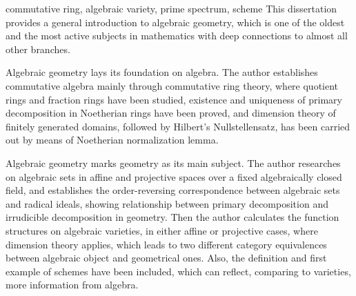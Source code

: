 

\begin{abstract}{交换幺环, 代数簇, 素谱, 概型}
  代数几何历史悠久而又充满活力, 与其它数学分支有着深刻的联系, 是一门重要的学科. 代数几何包含代数与几何, 可以看成代数理论应用到几何的研究之中.

  代数几何的理论根基在于代数. 本文从基本定义开始建立了以环论为主模论为辅的交换代数理论, 研究了商环与分式环的基本性质, 证明了Noether环上准素分解的存在性及其满足的唯一性, 以域论为基础利用Noether正规化引理证明了域的有限生成整环上的维数定理和Hilbert零点定理.

  代数几何的研究对象在于几何. 本文研究了固定代数闭域上的仿射与射影空间中的代数集, 建立了根式理想与代数集之间的对应, 从而将准素分解理论与几何相联系. 本文还讨论了代数簇上的函数结构, 以此将维数理论应用到几何中, 并证明了两组代数范畴与几何范畴的等价. 最后本文简要介绍了概型的概念, 其相比于代数簇能更完整地体现代数所提供的信息.
\end{abstract}

\begin{abstract*}{commutative ring, algebraic variety, prime spectrum, scheme}
  This dissertation provides a general introduction to algebraic geometry, which is one of the oldest and the most active subjects in mathematics with deep connections to almost all other branches.

  Algebraic geometry lays its foundation on algebra. The author establishes commutative algebra mainly through commutative ring theory, where quotient rings and fraction rings have been studied, existence and uniqueness of primary decomposition in Noetherian rings have been proved, and dimension theory of finitely generated domains, followed by Hilbert's Nullstellensatz, has been carried out by means of Noetherian normalization lemma.

  Algebraic geometry marks geometry as its main subject. The author researches on algebraic sets in affine and projective spaces over a fixed algebraically closed field, and establishes the order-reversing correspondence between algebraic sets and radical ideals, showing relationship between primary decomposition and irrudicible decomposition in geometry. Then the author calculates the function structures on algebraic varieties, in either affine or projective cases, where dimension theory applies, which leads to two different category equivalences between algebraic object and geometrical ones. Also, the definition and first example of schemes have been included, which can reflect, comparing to varieties, more information from algebra.
\end{abstract*}
